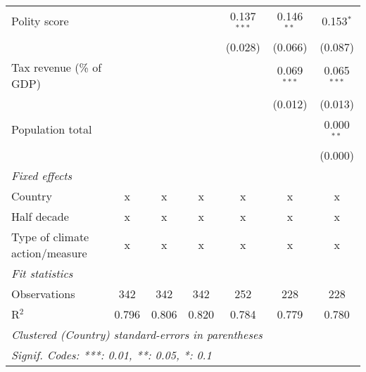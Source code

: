 \begin{tabular}{lcccccc}
   Polity score                                                            &         &                &                & 0.137$^{***}$  & 0.146$^{**}$   & 0.153$^{*}$\\   
                                                                           &         &                &                & (0.028)        & (0.066)        & (0.087)\\   
   Tax revenue (\% of GDP)                                                 &         &                &                &                & 0.069$^{***}$  & 0.065$^{***}$\\   
                                                                           &         &                &                &                & (0.012)        & (0.013)\\   
   Population total                                                        &         &                &                &                &                & 0.000$^{**}$\\   
                                                                           &         &                &                &                &                & (0.000)\\   
   \emph{Fixed effects}\\
   Country                                                                 & x       & x              & x              & x              & x              & x\\  
   Half decade                                                             & x       & x              & x              & x              & x              & x\\  
   Type of climate action/measure                                          & x       & x              & x              & x              & x              & x\\  
   \midrule \emph{Fit statistics}\\
   Observations                                                            & 342     & 342            & 342            & 252            & 228            & 228\\  
   R$^2$                                                                   & 0.796   & 0.806          & 0.820          & 0.784          & 0.779          & 0.780\\  
   \midrule
   \multicolumn{7}{l}{\emph{Clustered (Country) standard-errors in parentheses}}\\
   \multicolumn{7}{l}{\emph{Signif. Codes: ***: 0.01, **: 0.05, *: 0.1}}\\
\end{tabular}
\par\endgroup


